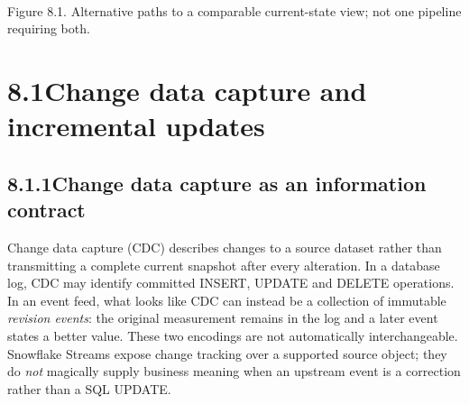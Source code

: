 \documentclass[11pt,twoside]{article}
\newcommand{\topic}[2]{\subsection*{#1\quad #2}}
\begin{document}
\begin{center}\\{\fontsize{8}{9.5}\selectfont\color{inkgray}Figure 8.1. Alternative paths to a comparable current-state view; not one pipeline requiring both.}\end{center}
\newpage
\section*{8.1\quad Change data capture and incremental updates}
\topic{8.1.1}{Change data capture as an information contract}
Change data capture (CDC) describes changes to a source dataset rather than transmitting a complete current snapshot after every alteration. In a database log, CDC may identify committed INSERT, UPDATE and DELETE operations. In an event feed, what looks like CDC can instead be a collection of immutable \emph{revision events}: the original measurement remains in the log and a later event states a better value. These two encodings are not automatically interchangeable. Snowflake Streams expose change tracking over a supported source object; they do \emph{not} magically supply business meaning when an upstream event is a correction rather than a SQL UPDATE.
\end{document}
